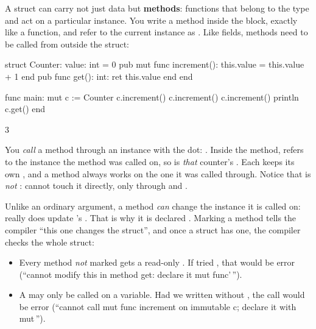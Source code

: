 A struct can carry not just data but \textbf{methods}: functions that belong to
the type and act on a particular instance. You write a method inside the
 block, exactly like a function, and refer to the current instance
as . Like fields, methods need  to be called from outside
the struct:

\begin{salamen}
struct Counter:
    value: int = 0
    pub mut func increment():
        this.value = this.value + 1
    end
    pub func get(): int:
        ret this.value
    end
end

func main:
    mut c := Counter {}
    c.increment()
    c.increment()
    c.increment()
    println c.get()
end
\end{salamen}

\begin{progout}
3
\end{progout}

You \emph{call} a method through an instance with the dot: .
Inside the method,  refers to the instance the method was called on,
so  is \emph{that} counter's . Each 
keeps its own , and a method always works on the one it was called
through. Notice that  is \emph{not} :  cannot
touch it directly, only through  and .

Unlike an ordinary argument, a method \emph{can} change the instance it is called
on:  really does update 's . That is why it
is declared . Marking a method  tells the compiler
``this one changes the struct'', and once a struct has one, the compiler checks
the whole struct:

\begin{itemize}[leftmargin=1.4em]
  \item Every method \emph{not} marked  gets a read-only .
        If  tried , that would be error
         (``cannot modify \textquotesingle{}this\textquotesingle{} in method \textquotesingle{}get\textquotesingle{}: declare it \textquotesingle{}mut
        func'\,'').
  \item A  may only be called on a  variable. Had we
        written  without , the call
         would be error  (``cannot call \textquotesingle{}mut func\textquotesingle{}
        \textquotesingle{}increment\textquotesingle{} on immutable \textquotesingle{}c\textquotesingle{}; declare it with \textquotesingle{}mut\textquotesingle{}\,'').
\end{itemize}

